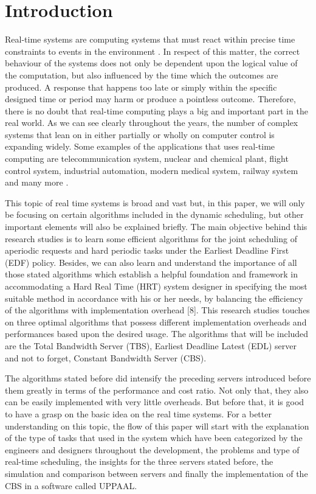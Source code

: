 \section{Introduction}
Real-time systems are computing systems that must react within precise time constraints to events in the environment \cite{b2}. In respect of this matter, the correct behaviour of the systems does not only be dependent upon the logical value of the computation, but also influenced by the time which the outcomes are produced. A response that happens too late or simply within the specific designed time or period may harm or produce a pointless outcome. Therefore, there is no doubt that real-time computing plays a big and important part in the real world. As we can see clearly throughout the years, the number of complex systems that lean on in either partially or wholly on computer control is expanding widely. Some examples of the applications that uses real-time computing are telecommunication system, nuclear and chemical plant, flight control system, industrial automation, modern medical system, railway system and many more \cite{b2}.

This topic of real time systems is broad and vast but, in this paper, we will only be focusing on certain algorithms included in the dynamic scheduling, but other important elements will also be explained briefly. The main objective behind this research studies is to learn some efficient algorithms for the joint scheduling of aperiodic requests and hard periodic tasks under the Earliest Deadline First (EDF) policy. Besides, we can also learn and understand the importance of all those stated algorithms which establish a helpful foundation and framework in accommodating a Hard Real Time (HRT) system designer in specifying the most suitable method in accordance with his or her needs, by balancing the efficiency of the algorithms with implementation overhead [8]. This research studies touches on three optimal algorithms that possess different implementation overheads and performances based upon the desired usage. The algorithms that will be included are the Total Bandwidth Server (TBS), Earliest Deadline Latest (EDL) server and not to forget, Constant Bandwidth Server (CBS). 

The algorithms stated before did intensify the preceding servers introduced before them greatly in terms of the performance and cost ratio. Not only that, they also can be easily implemented with very little overheads. But before that, it is good to have a grasp on the basic idea on the real time systems. For a better understanding on this topic, the flow of this paper will start with the explanation of the type of tasks that used in the system which have been categorized by the engineers and designers throughout the development, the problems and type of real-time scheduling, the insights for the three servers stated before, the simulation and comparison between servers and finally the implementation of the CBS in a software called UPPAAL.  

